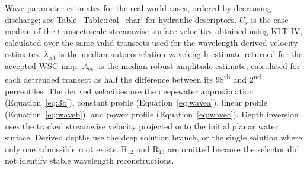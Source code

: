 \begin{table}[htbp]
\caption{Wave-parameter estimates for the real-world cases, ordered by decreasing discharge; see Table~\ref{Table:real_char} for hydraulic descriptors. $U_s$ is the case median of the transect-scale streamwise surface velocities obtained using KLT-IV, calculated over the same valid transects used for the wavelength-derived velocity estimates. $\lambda_{\mathrm{est}}$ is the median autocorrelation wavelength estimate returned for the accepted WSG map. $A_{\mathrm{est}}$ is the median robust amplitude estimate, calculated for each detrended transect as half the difference between its 98\textsuperscript{th} and 2\textsuperscript{nd} percentiles. The derived velocities use the deep-water approximation (Equation~\ref{eq:3b}), constant profile (Equation~\ref{eq:wavea}), linear profile (Equation~\ref{eq:waveb}), and power profile (Equation~\ref{eq:wavec}). Depth inversion uses the tracked streamwise velocity projected onto the initial planar water surface. Derived depths use the deep solution branch, or the single solution where only one admissible root exists. R$_{12}$ and R$_{13}$ are omitted because the selector did not identify stable wavelength reconstructions.}
\label{Table:real_res}
\end{table}
